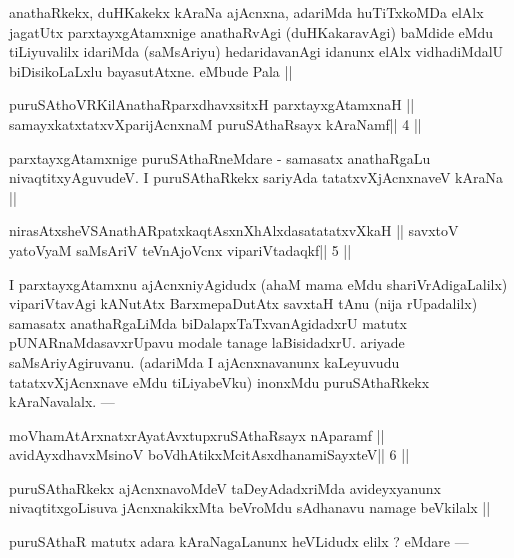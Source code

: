 \begin{artha}
anathaRkekx, duHKakekx kAraNa ajAcnxna, adariMda huTiTxkoMDa elAlx jagatUtx parxtayxgAtamxnige anathaRvAgi (duHKakaravAgi) baMdide eMdu tiLiyuvalilx idariMda (saMsAriyu) hedaridavanAgi idanunx elAlx vidhadiMdalU biDisikoLaLxlu bayasutAtxne. eMbude Pala ||
\end{artha}

\begin{shl}
puruSAthoVR\s KilAnathaRparxdhavxsitxH parxtayxgAtamxnaH ||
samayxkatxtatxvXparijAcnxnaM puruSAthaRsayx kAraNamf\hfill || 4 ||
\end{shl}

\begin{artha}
parxtayxgAtamxnige puruSAthaRneMdare - samasatx anathaRgaLu 
nivaqtitxyAguvudeV. I puruSAthaRkekx sariyAda tatatxvXjAcnxnaveV kAraNa ||
\end{artha}


\begin{shl}
nirasAtxsheVSAnathARpatxkaqtAsxnXhAlxdasatatatxvXkaH ||
savxtoV yatoV\s yaM saMsAriV teVnAjoVcnx vipariVtadaqkf\hfill || 5 ||
\end{shl}

\begin{artha}
I parxtayxgAtamxnu ajAcnxniyAgidudx (ahaM mama eMdu shariVrAdigaLalilx) vipariVtavAgi kANutAtx BarxmepaDutAtx savxtaH tAnu (nija rUpadalilx) samasatx anathaRgaLiMda biDalapxTaTxvanAgidadxrU matutx pUNARnaMdasavxrUpavu modale tanage laBisidadxrU. ariyade saMsAriyAgiruvanu. (adariMda I ajAcnxnavanunx kaLeyuvudu tatatxvXjAcnxnave eMdu tiLiyabeVku) inonxMdu puruSAthaRkekx kAraNavalalx. ---
\end{artha}

\begin{shl}
moVhamAtArxnatxrAyatAvxtupxruSAthaRsayx nAparamf ||
avidAyxdhavxMsinoV boVdhAtikxMcitAsxdhanamiSayxteV\hfill || 6 ||
\end{shl}

\begin{artha}
puruSAthaRkekx ajAcnxnavoMdeV taDeyAdadxriMda avideyxyanunx nivaqtitxgoLisuva jAcnxnakikxMta beVroMdu sAdhanavu namage beVkilalx ||
\end{artha}

\begin{artha}
puruSAthaR matutx adara kAraNagaLanunx heVLidudx elilx ? eMdare ---
\end{artha} 

